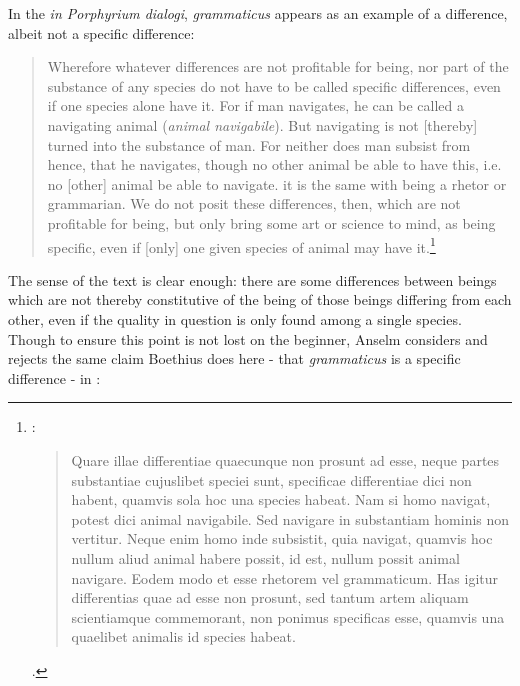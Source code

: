 \documentclass[]{article}
\begin{document}
In the \textit{in Porphyrium dialogi}, \textit{grammaticus} appears as an example of a difference, albeit not a specific difference:
\begin{quote}
Wherefore whatever differences are not profitable for being, nor part of the substance of any species do not have to be called specific differences, even if one species alone have it. For if man navigates, he can be called a navigating animal (\textit{animal navigabile}). But navigating is not [thereby] turned into the substance of man. For neither does man subsist from hence, that he navigates, though no other animal be able to have this, i.e. no [other] animal be able to navigate. it is the same with being a rhetor or grammarian. We do not posit these differences, then, which are not profitable for being, but only bring some art or science to mind, as being specific, even if [only] one given species of animal may have it.\footnote{\cite[BDP 54B-C]{BDP}:
\begin{quote}
Quare illae differentiae quaecunque non prosunt ad esse, neque partes substantiae cujuslibet speciei sunt, specificae differentiae dici non habent, quamvis sola hoc una species habeat. Nam si homo navigat, potest dici animal navigabile. Sed navigare in substantiam hominis non vertitur. Neque enim homo inde subsistit, quia navigat, quamvis hoc nullum aliud animal habere possit, id est, nullum possit animal navigare. Eodem modo et esse rhetorem vel grammaticum. Has igitur differentias quae ad esse non prosunt, sed tantum artem aliquam scientiamque commemorant, non ponimus specificas esse, quamvis una quaelibet animalis id species habeat. 
\end{quote}.}
\end{quote}
The sense of the text is clear enough: there are some differences between beings which are not thereby constitutive of the being of those beings differing from each other, even if the quality in question is only found among a single species. Though to ensure this point is not lost on the beginner, Anselm considers and rejects the same claim Boethius does here - that \textit{grammaticus} is a specific difference - in \cite[DG ch. 13]{Anselm1974}:
\end{document}
